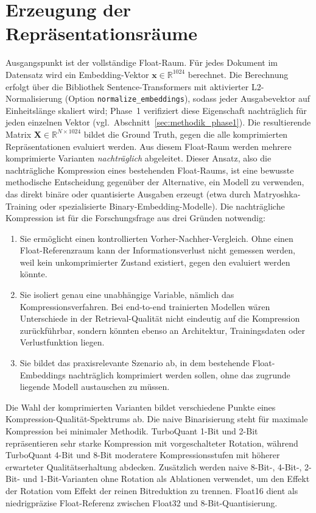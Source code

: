 \section{Erzeugung der Repräsentationsräume}
\label{sec:methodik_repraeraeume}
%
Ausgangspunkt ist der vollständige Float-Raum.
Für jedes Dokument im Datensatz wird ein Embedding-Vektor $\mathbf{x} \in \mathbb{R}^{1024}$ berechnet.
Die Berechnung erfolgt über die Bibliothek Sentence-Transformers \cite{reimers_2019_sbert} mit aktivierter L2-Normalisierung (Option \texttt{normalize\_embeddings}), sodass jeder Ausgabevektor auf Einheitslänge skaliert wird; Phase~1 verifiziert diese Eigenschaft nachträglich für jeden einzelnen Vektor (vgl.\ Abschnitt~\ref{sec:methodik_phase1}).
Die resultierende Matrix $\mathbf{X} \in \mathbb{R}^{N \times 1024}$ bildet die Ground Truth, gegen die alle komprimierten Repräsentationen evaluiert werden.
%
Aus diesem Float-Raum werden mehrere komprimierte Varianten \emph{nachträglich} abgeleitet.
Dieser Ansatz, also die nachträgliche Kompression eines bestehenden Float-Raums, ist eine bewusste methodische Entscheidung gegenüber der Alternative, ein Modell zu verwenden, das direkt binäre oder quantisierte Ausgaben erzeugt (etwa durch Matryoshka-Training oder spezialisierte Binary-Embedding-Modelle).
Die nachträgliche Kompression ist für die Forschungsfrage aus drei Gründen notwendig:
\begin{enumerate}
  \item Sie ermöglicht einen kontrollierten Vorher-Nachher-Vergleich.
Ohne einen Float-Referenzraum kann der Informationsverlust nicht gemessen werden, weil kein unkomprimierter Zustand existiert, gegen den evaluiert werden könnte.
  \item Sie isoliert genau eine unabhängige Variable, nämlich das Kompressionsverfahren.
Bei end-to-end trainierten Modellen wären Unterschiede in der Retrieval-Qualität nicht eindeutig auf die Kompression zurückführbar, sondern könnten ebenso an Architektur, Trainingsdaten oder Verlustfunktion liegen.
  \item Sie bildet das praxisrelevante Szenario ab, in dem bestehende Float-Embeddings nachträglich komprimiert werden sollen, ohne das zugrunde liegende Modell austauschen zu müssen.
\end{enumerate}
%
Die Wahl der komprimierten Varianten bildet verschiedene Punkte eines Kompression-Qualität-Spektrums ab.
Die naive Binarisierung steht für maximale Kompression bei minimaler Methodik.
TurboQuant 1-Bit und 2-Bit repräsentieren sehr starke Kompression mit vorgeschalteter Rotation, während TurboQuant 4-Bit und 8-Bit moderatere Kompressionsstufen mit höherer erwarteter Qualitätserhaltung abdecken.
Zusätzlich werden naive 8-Bit-, 4-Bit-, 2-Bit- und 1-Bit-Varianten ohne Rotation als Ablationen verwendet, um den Effekt der Rotation vom Effekt der reinen Bitreduktion zu trennen.
Float16 dient als niedrigpräzise Float-Referenz zwischen Float32 und 8-Bit-Quantisierung.
%
